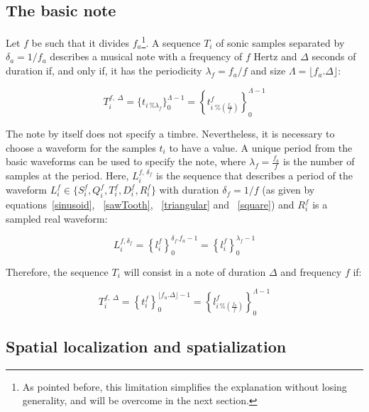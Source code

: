 \subsection{The basic note}\label{notaBasica}

Let $f$ be such that it divides $f_a$\footnote{As pointed before, this limitation simplifies the explanation without losing generality, and will be overcome in the next section.}. A sequence $T_i$ of sonic samples separated by $\delta_a=1/f_a$ describes a musical note with a frequency of $f$ Hertz and $\Delta$ seconds of duration if, and only if, it has the periodicity $\lambda_f=f_a/f$ and size $\Lambda=\lfloor f_a . \Delta \rfloor $:

\begin{equation}\label{eq:notaBasica}
T_i^{f,\; \Delta}=\{t_{i \, \% \lambda_f} \}_0^{\Lambda-1}= \left \{t^f_{i \; \% \left( \frac{f_a}{f} \right) } \right \}_0^{\Lambda-1}
\end{equation}

The note by itself does not specify a timbre. Nevertheless, it is necessary to choose a waveform for the samples $t_i$ to have a value. A unique period from the basic waveforms can be used to specify the note, where $\lambda_f=\frac{f_a}{f}$ is the number of samples at the period. Here, $L_i^{f,\, \delta_f} $ is the sequence that describes a period of the waveform $L_i^f \in \{S_i^f,Q_i^f,T_i^f,D_i^f,R_i^f \}$ with duration $\delta_f=1/f$ (as given by equations~\ref{sinusoid}, ~\ref{sawTooth}, ~\ref{triangular} and ~\ref{square}) and $R_i^f$ is a sampled real waveform:

\begin{equation}\label{periodoUnico}
L_i^{f , \delta_f } = \left\{ l_i^f \right\}_0^{\delta_f . f_a -1}=\left\{ l_i^f \right\}_0^{\lambda_f-1}
\end{equation}

Therefore, the sequence $T_i$ will consist in a note of duration $\Delta$ and frequency $f$ if:

\begin{equation}\label{eq:notaBasicaTimbre}
T_i^{f,\; \Delta}=\left\{t_i^f\right\}_0^{\lfloor f_a . \Delta \rfloor -1}=\left \{ l^f_{i\,\%\left(\frac{f_a}{f}\right)} \right \}_0^{\Lambda-1}
\end{equation}

\subsection{Spatial localization and spatialization}\label{subsec:spac}

